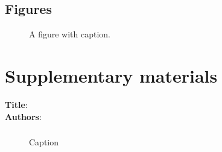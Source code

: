 \documentclass[12pt]{article}
\begin{document}
\clearpage
\subsection*{Figures}

\begin{figure}[h!]
  \begin{center}
    \caption{A figure with caption. }
    \label{fig:concept}
  \end{center}
\end{figure}


























\clearpage

\newcommand{\beginsupplement}{%
        \setcounter{page}{1}
        \setcounter{table}{0}
        \renewcommand{\thetable}{S\arabic{table}}%
        \setcounter{figure}{0}
        \renewcommand{\thefigure}{S\arabic{figure}}%
        }

\section*{Supplementary materials}

\begin{center}
\textbf{Title}:       \\
\textbf{Authors}:     \\
\end{center}

\beginsupplement


\subsubsection*{}


\begin{figure}[h!]
  \begin{center}
    \caption{Caption }
    \label{fig:label}
  \end{center}
\end{figure}
\end{document}
